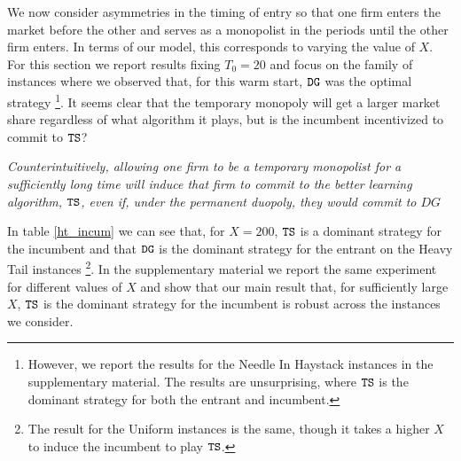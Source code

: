 \documentclass[../competing_bandits.tex]{subfiles}
\begin{document}
 We now consider asymmetries in the timing of entry so that one firm enters the market before the other and serves as a monopolist in the periods until the other firm enters. In terms of our model, this corresponds to varying the value of $X$. For this section we report results fixing $T_0 = 20$ and focus on the family of instances where we observed that, for this warm start, $\mathtt{DG}$ was the optimal strategy \footnote{However, we report the results for the Needle In Haystack instances in the supplementary material. The results are unsurprising, where $\mathtt{TS}$ is the dominant strategy for both the entrant and incumbent.}. It seems clear that the temporary monopoly will get a larger market share regardless of what algorithm it plays, but is the incumbent incentivized to commit to $\mathtt{TS}$?

\begin{finding}
\textit{Counterintuitively, allowing one firm to be a temporary monopolist for a sufficiently long time will induce that firm to commit to the better learning algorithm, $\mathtt{TS}$, even if, under the permanent duopoly, they would commit to $DG$}
\end{finding}

In table \ref{ht_incum} we can see that, for $X = 200$, $\mathtt{TS}$ is a dominant strategy for the incumbent and that $\mathtt{DG}$ is the dominant strategy for the entrant on the Heavy Tail instances \footnote{The result for the Uniform instances is the same, though it takes a higher $X$ to induce the incumbent to play $\mathtt{TS}$.}. In the supplementary material we report the same experiment for different values of $X$ and show that our main result that, for sufficiently large $X$, $\mathtt{TS}$ is the dominant strategy for the incumbent is robust across the instances we consider.
\end{document}
